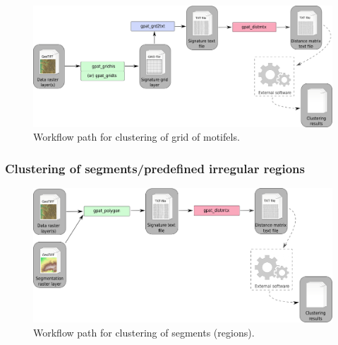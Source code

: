 \documentclass[12pt,margin=0.5in]{article}
\begin{document}
\begin{figure}[h]
	\centering
	\includegraphics[width=\textwidth]{cluster_grid_scheme.png}
	\caption{Workflow path for clustering of grid of motifels.}
	\label{FIG:CLUSTER_GRID}
\end{figure}

\FloatBarrier

\subsubsection{Clustering of segments/predefined irregular regions}

\begin{figure}[h]
	\centering
	\includegraphics[width=\textwidth]{cluster_seg_scheme.png}
	\caption{Workflow path for clustering of segments (regions).}
	\label{FIG:CLUSTER_SEGMENT}
\end{figure}

\FloatBarrier
\end{document}
